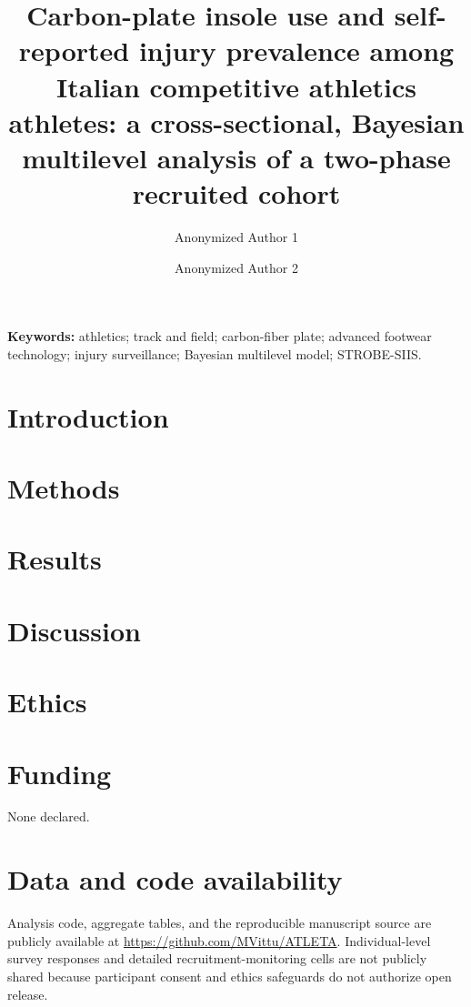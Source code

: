 \documentclass[11pt]{article}
\title{Carbon-plate insole use and self-reported injury prevalence among\\
Italian competitive athletics athletes: a cross-sectional, Bayesian\\
multilevel analysis of a two-phase recruited cohort}
\author{Anonymized Author 1 \and Anonymized Author 2}
\date{}
\begin{document}
\linenumbers
\modulolinenumbers[1]

\maketitle
\label{sec:title}

\begin{abstract}
\label{sec:abstract}

\end{abstract}

\noindent\textbf{Keywords:} athletics; track and field; carbon-fiber plate; advanced footwear technology; injury surveillance; Bayesian multilevel model; STROBE-SIIS.

\section{Introduction}
\label{sec:introduction}


\section{Methods}
\label{sec:methods}


\section{Results}
\label{sec:results}


\section{Discussion}
\label{sec:discussion}


\section*{Ethics}


\section*{Funding}
\label{sec:funding}
None declared.

\section*{Data and code availability}
Analysis code, aggregate tables, and the reproducible manuscript source are publicly available at \url{https://github.com/MVittu/ATLETA}. Individual-level survey responses and detailed recruitment-monitoring cells are not publicly shared because participant consent and ethics safeguards do not authorize open release.
\end{document}
